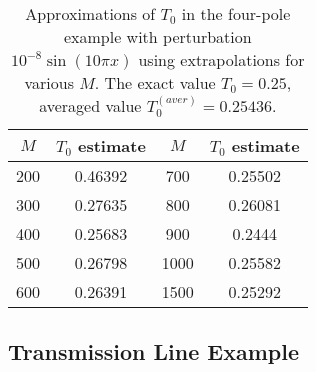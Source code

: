 \documentclass[journal,twoside]{IEEEtran}
\begin{document}
\begin{table}[h]
\begin{center}
\begin{tabular}{|c|c||c|c|}
\hline
\rule{0cm}{10pt}
$M$ & $T_0$ estimate & $M$ & $T_0$ estimate \\[3pt]
\hline
\rule{0cm}{10pt}
  200 &    0.46392 & 700  & 0.25502 \\[3pt]
\hline
\rule{0cm}{10pt}  
  300 &  0.27635  &   800  &  0.26081 \\[3pt]
\hline
\rule{0cm}{10pt}  
400  &  0.25683 & 900  & 0.2444 \\[3pt] 
\hline
\rule{0cm}{10pt}    
500  &  0.26798 & 1000  &  0.25582 \\
\hline
\rule{0cm}{10pt}    
600  &  0.26391 & 1500  &  0.25292 \\
\hline
\end{tabular}
\end{center}
\caption{Approximations of $T_0$ in the four-pole example with perturbation  $10^{-8}\sin(10\pi x)$ using extrapolations for various $M$. The exact value $T_0=0.25$, averaged value $T_0^{(aver)}=0.25436$.}
\label{T0approx_ampn8}
\end{table} 

\subsection{Transmission Line Example} \label{transmission_line_new}
\end{document}
